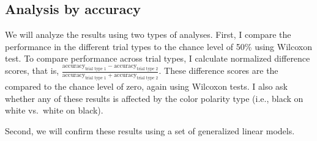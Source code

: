 \documentclass[
]{article}
\begin{document}
\subsection{Analysis by accuracy}\label{analysis-by-accuracy}

We will analyze the results using two types of analyses. First, I
compare the performance in the different trial types to the chance level
of 50\% using Wilcoxon test. To compare performance across trial types,
I calculate normalized difference scores, that is,
\(\frac{\text{accuracy}_{\text{trial type 1}} - \text{accuracy}_{\text{trial type 2}}}{\text{accuracy}_{\text{trial type 1}} + \text{accuracy}_{\text{trial type 2}}}\).
These difference scores are the compared to the chance level of zero,
again using Wilcoxon tests. I also ask whether any of these results is
affected by the color polarity type (i.e., black on white vs.~white on
black).

Second, we will confirm these results using a set of generalized linear
models.
\end{document}
